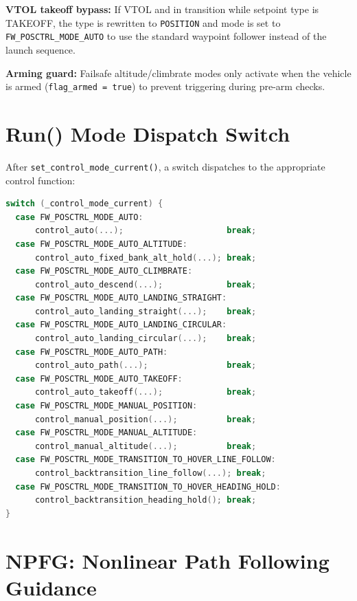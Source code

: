\documentclass[12pt,a4paper]{article}
\begin{document}
\textbf{VTOL takeoff bypass:} If VTOL and in transition while setpoint
type is TAKEOFF, the type is rewritten to \texttt{POSITION} and mode is
set to \texttt{FW\_POSCTRL\_MODE\_AUTO} to use the standard waypoint
follower instead of the launch sequence.

\textbf{Arming guard:} Failsafe altitude/climbrate modes only activate
when the vehicle is armed (\texttt{flag\_armed = true}) to prevent triggering
during pre-arm checks.

\section{Run() Mode Dispatch Switch}
\label{sec:dispatch}

After \texttt{set\_control\_mode\_current()}, a switch dispatches to the
appropriate control function:

\begin{lstlisting}[language=C++]
switch (_control_mode_current) {
  case FW_POSCTRL_MODE_AUTO:
      control_auto(...);                     break;
  case FW_POSCTRL_MODE_AUTO_ALTITUDE:
      control_auto_fixed_bank_alt_hold(...); break;
  case FW_POSCTRL_MODE_AUTO_CLIMBRATE:
      control_auto_descend(...);             break;
  case FW_POSCTRL_MODE_AUTO_LANDING_STRAIGHT:
      control_auto_landing_straight(...);    break;
  case FW_POSCTRL_MODE_AUTO_LANDING_CIRCULAR:
      control_auto_landing_circular(...);    break;
  case FW_POSCTRL_MODE_AUTO_PATH:
      control_auto_path(...);                break;
  case FW_POSCTRL_MODE_AUTO_TAKEOFF:
      control_auto_takeoff(...);             break;
  case FW_POSCTRL_MODE_MANUAL_POSITION:
      control_manual_position(...);          break;
  case FW_POSCTRL_MODE_MANUAL_ALTITUDE:
      control_manual_altitude(...);          break;
  case FW_POSCTRL_MODE_TRANSITION_TO_HOVER_LINE_FOLLOW:
      control_backtransition_line_follow(...); break;
  case FW_POSCTRL_MODE_TRANSITION_TO_HOVER_HEADING_HOLD:
      control_backtransition_heading_hold(); break;
}
\end{lstlisting}

\section{NPFG: Nonlinear Path Following Guidance}
\end{document}

